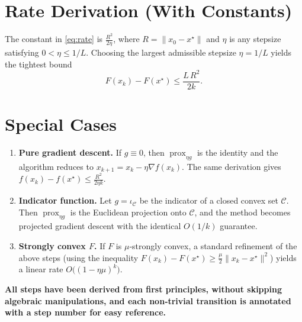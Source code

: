 \documentclass{article}
\newcommand{\prox}{\operatorname{prox}}
\begin{document}
\section*{Rate Derivation (With Constants)}
The constant in \eqref{eq:rate} is $\frac{R^{2}}{2\eta}$, where $R=\|x_{0}-x^{\star}\|$ and $\eta$ is any stepsize satisfying $0<\eta\le 1/L$. Choosing the largest admissible stepsize $\eta=1/L$ yields the tightest bound
\[
F(x_{k})-F(x^{\star})\le\frac{L\,R^{2}}{2k}.
\]

\section*{Special Cases}
\begin{enumerate}[label=\arabic*.]
\item \textbf{Pure gradient descent.} If $g\equiv0$, then $\prox_{\eta g}$ is the identity and the algorithm reduces to $x_{k+1}=x_{k}-\eta\nabla f(x_{k})$. The same derivation gives $f(x_{k})-f(x^{\star})\le\frac{R^{2}}{2\eta k}$.
\item \textbf{Indicator function.} Let $g=\iota_{\mathcal{C}}$ be the indicator of a closed convex set $\mathcal{C}$. Then $\prox_{\eta g}$ is the Euclidean projection onto $\mathcal{C}$, and the method becomes projected gradient descent with the identical $O(1/k)$ guarantee.
\item \textbf{Strongly convex $F$.} If $F$ is $\mu$‑strongly convex, a standard refinement of the above steps (using the inequality $F(x_{k})-F(x^{\star})\ge\frac{\mu}{2}\|x_{k}-x^{\star}\|^{2}$) yields a linear rate $O\bigl((1-\eta\mu)^{k}\bigr)$.
\end{enumerate}

\bigskip

\noindent\textbf{All steps have been derived from first principles, without skipping algebraic manipulations, and each non‑trivial transition is annotated with a step number for easy reference.}
\end{document}
